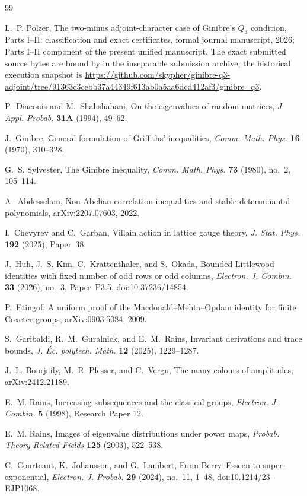 \documentclass[11pt,reqno]{amsart}
\theoremstyle{plain}
\theoremstyle{definition}
\begin{document}
\begin{thebibliography}{99}

L.~P. Polzer,
The two-minus adjoint-character case of Ginibre's $Q_3$ condition,
Parts I--II: classification and exact certificates, formal journal manuscript,
2026; Parts I--II component of the present unified manuscript.  The exact
submitted source bytes are bound
by  in the
inseparable submission archive; the historical execution snapshot is
\url{https://github.com/skypher/ginibre-q3-adjoint/tree/91363c3cebb37a44349f613ab0a5aa6dcd412af3/ginibre_q3}.

P.~Diaconis and M.~Shahshahani,
On the eigenvalues of random matrices,
\emph{J. Appl. Probab.} \textbf{31A} (1994), 49--62.

J.~Ginibre,
General formulation of Griffiths' inequalities,
\emph{Comm. Math. Phys.} \textbf{16} (1970), 310--328.

G.~S. Sylvester,
The Ginibre inequality,
\emph{Comm. Math. Phys.} \textbf{73} (1980), no.~2, 105--114.

A.~Abdesselam,
Non-Abelian correlation inequalities and stable determinantal polynomials,
arXiv:2207.07603, 2022.

I.~Chevyrev and C.~Garban,
Villain action in lattice gauge theory,
\emph{J. Stat. Phys.} \textbf{192} (2025), Paper~38.

J.~Huh, J.~S. Kim, C.~Krattenthaler, and S.~Okada,
Bounded Littlewood identities with fixed number of odd rows or odd columns,
\emph{Electron. J. Combin.} \textbf{33} (2026), no.~3, Paper~P3.5,
doi:10.37236/14854.

P.~Etingof,
A uniform proof of the Macdonald--Mehta--Opdam identity for finite Coxeter
groups,
arXiv:0903.5084, 2009.

S.~Garibaldi, R.~M.~Guralnick, and E.~M.~Rains,
Invariant derivations and trace bounds,
\emph{J. \'{E}c. polytech. Math.} \textbf{12} (2025), 1229--1287.

J.~L. Bourjaily, M.~R. Plesser, and C.~Vergu,
The many colours of amplitudes,
arXiv:2412.21189.

E.~M. Rains,
Increasing subsequences and the classical groups,
\emph{Electron. J. Combin.} \textbf{5} (1998), Research Paper 12.

E.~M. Rains,
Images of eigenvalue distributions under power maps,
\emph{Probab. Theory Related Fields} \textbf{125} (2003), 522--538.

C.~Courteaut, K.~Johansson, and G.~Lambert,
From Berry--Esseen to super-exponential,
\emph{Electron. J. Probab.} \textbf{29} (2024), no.~11, 1--48,
doi:10.1214/23-EJP1068.

\end{thebibliography}
\end{document}
